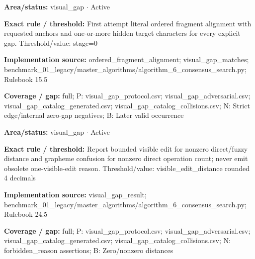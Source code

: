 \begin{tcolorbox}[enhanced,breakable,colback=white,colframe=Muted!45,boxrule=0.45pt,arc=1.5pt,left=6pt,right=6pt,top=5pt,bottom=5pt,title={\texttt{VG-RAW-STAGE-07}},title after break={\texttt{VG-RAW-STAGE-07}\ (continued)},fonttitle=\headingfont\bfseries\color{Navy},coltitle=Navy]
\textbf{Area/status:} visual\_\allowbreak{}gap $\boldsymbol{\cdot}$ Active\par
\smallskip
\textbf{Exact rule / threshold:} First attempt literal ordered fragment alignment with requested anchors and one-or-more hidden target characters for every explicit gap. Threshold/\allowbreak{}value: stage=0\par
\smallskip
\textbf{Implementation source:} ordered\_\allowbreak{}fragment\_\allowbreak{}alignment; visual\_\allowbreak{}gap\_\allowbreak{}matches; benchmark\_\allowbreak{}01\_\allowbreak{}legacy/\allowbreak{}master\_\allowbreak{}algorithms/\allowbreak{}algorithm\_\allowbreak{}6\_\allowbreak{}consensus\_\allowbreak{}search.py; Rulebook 15.5\par
\smallskip
\textbf{Coverage / gap:} full; P: visual\_\allowbreak{}gap\_\allowbreak{}protocol.csv; visual\_\allowbreak{}gap\_\allowbreak{}adversarial.csv; visual\_\allowbreak{}gap\_\allowbreak{}catalog\_\allowbreak{}generated.csv; visual\_\allowbreak{}gap\_\allowbreak{}catalog\_\allowbreak{}collisions.csv; N: Strict edge/\allowbreak{}internal zero-gap negatives; B: Later valid occurrence
\end{tcolorbox}
\begin{tcolorbox}[enhanced,breakable,colback=white,colframe=Muted!45,boxrule=0.45pt,arc=1.5pt,left=6pt,right=6pt,top=5pt,bottom=5pt,title={\texttt{VG-REASONS-15}},title after break={\texttt{VG-REASONS-15}\ (continued)},fonttitle=\headingfont\bfseries\color{Navy},coltitle=Navy]
\textbf{Area/status:} visual\_\allowbreak{}gap $\boldsymbol{\cdot}$ Active\par
\smallskip
\textbf{Exact rule / threshold:} Report bounded visible edit for nonzero direct/\allowbreak{}fuzzy distance and grapheme confusion for nonzero direct operation count; never emit obsolete one-visible-edit reason. Threshold/\allowbreak{}value: visible\_\allowbreak{}edit\_\allowbreak{}distance rounded 4 decimals\par
\smallskip
\textbf{Implementation source:} visual\_\allowbreak{}gap\_\allowbreak{}result; benchmark\_\allowbreak{}01\_\allowbreak{}legacy/\allowbreak{}master\_\allowbreak{}algorithms/\allowbreak{}algorithm\_\allowbreak{}6\_\allowbreak{}consensus\_\allowbreak{}search.py; Rulebook 24.5\par
\smallskip
\textbf{Coverage / gap:} full; P: visual\_\allowbreak{}gap\_\allowbreak{}protocol.csv; visual\_\allowbreak{}gap\_\allowbreak{}adversarial.csv; visual\_\allowbreak{}gap\_\allowbreak{}catalog\_\allowbreak{}generated.csv; visual\_\allowbreak{}gap\_\allowbreak{}catalog\_\allowbreak{}collisions.csv; N: forbidden\_\allowbreak{}reason assertions; B: Zero/\allowbreak{}nonzero distances
\end{tcolorbox}
